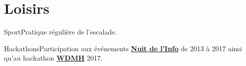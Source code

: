 \documentclass{tccv}
\begin{document}
\section{Loisirs}
\begin{factlist}

\item{Sport}{Pratique régulière de l'escalade.}

\item{Hackathons}{Participation aux événements \href{https://www.nuitdelinfo.com}{\bfseries Nuit de l'Info} de 2013 à 2017 ainsi qu'au hackathon \href{http://wdmh.fr}{\bfseries WDMH} 2017.}

\end{factlist}
\end{document}
